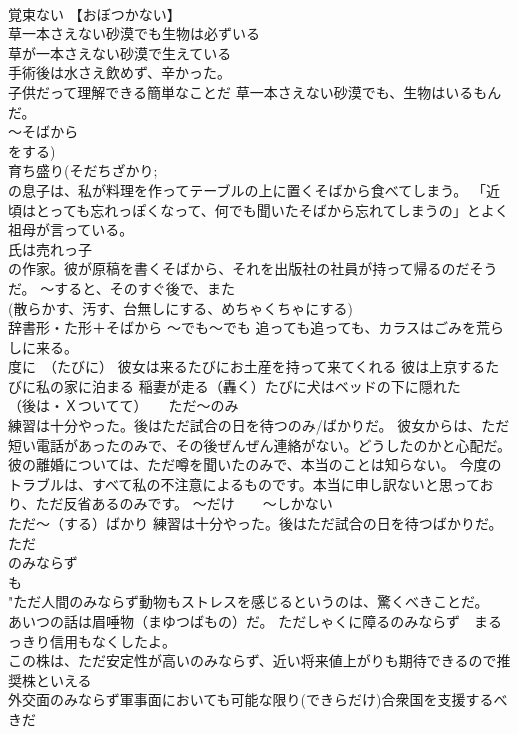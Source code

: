 \documentclass[8pt]{extreport}
\begin{document}
\begin{CJK}{UTF8}{min}
\\	覚束ない 【おぼつかない】 
\\	草一本さえない砂漠でも生物は必ずいる 
\\	草が一本さえない砂漠で生えている 
\\	手術後は水さえ飲めず、辛かった。 
\\	子供だって理解できる簡単なことだ 草一本さえない砂漠でも、生物はいるもんだ。
\\	～そばから 
\\	をする)	
\\	育ち盛り(そだちざかり;
\\	の息子は、私が料理を作ってテーブルの上に置くそばから食べてしまう。 「近頃はとっても忘れっぽくなって、何でも聞いたそばから忘れてしまうの」とよく祖母が言っている。 
\\	氏は売れっ子
\\	の作家。彼が原稿を書くそばから、それを出版社の社員が持って帰るのだそうだ。	～すると、そのすぐ後で、また 
\\	(散らかす、汚す、台無しにする、めちゃくちゃにする) 
\\	辞書形・た形＋そばから	～でも～でも 追っても追っても、カラスはごみを荒らしに来る。 
\\	度に　（たびに） 彼女は来るたびにお土産を持って来てくれる 彼は上京するたびに私の家に泊まる 稲妻が走る（轟く）たびに犬はベッドの下に隠れた
\\	（後は・Ｘついてて）　　ただ～のみ	
\\	練習は十分やった。後はただ試合の日を待つのみ/ばかりだ。 彼女からは、ただ短い電話があったのみで、その後ぜんぜん連絡がない。どうしたのかと心配だ。 彼の離婚については、ただ噂を聞いたのみで、本当のことは知らない。 今度のトラブルは、すべて私の不注意によるものです。本当に申し訳ないと思っており、ただ反省あるのみです。	～だけ　　～しかない 
\\	ただ～（する）ばかり 練習は十分やった。後はただ試合の日を待つばかりだ。
\\	ただ
\\	のみならず 
\\	も	
\\	"ただ人間のみならず動物もストレスを感じるというのは、驚くべきことだ。 
\\	あいつの話は眉唾物（まゆつばもの）だ。 ただしゃくに障るのみならず　まるっきり信用もなくしたよ。 
\\	この株は、ただ安定性が高いのみならず、近い将来値上がりも期待できるので推奨株といえる 
\\	外交面のみならず軍事面においても可能な限り(できらだけ)合衆国を支援するべきだ 　

\end{CJK}
\end{document}
